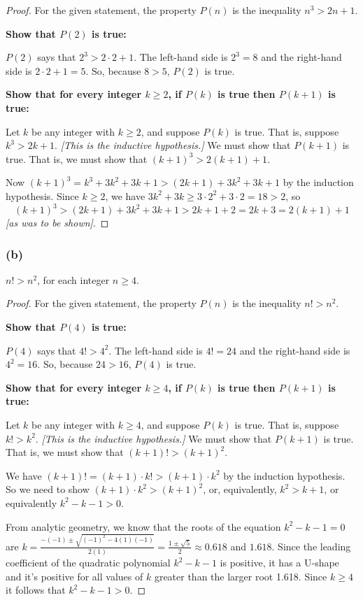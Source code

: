 \documentclass[14pt]{extarticle}
\newcommand{\dps}{\displaystyle}
\begin{document}
\begin{proof}
For the given statement, the property $P(n)$ is the inequality $n^3 > 2n + 1$. 

{\bf Show that $P(2)$ is true:} 

$P(2)$ says that $2^3 > 2\cdot2 + 1$. The left-hand side is $2^3 = 8$ and the right-hand side is $2 \cdot 2 + 1 = 5$. So, because $8 > 5$, $P(2)$ is true. 

{\bf Show that for every integer $k \geq 2$, if $P(k)$ is true then $P(k + 1)$ is true:} 

Let $k$ be any integer with $k \geq 2$, and suppose $P(k)$ is true. That is, suppose $k^3 > 2k + 1$. {\it [This is the inductive hypothesis.]} We must show that $P(k + 1)$ is true. That is, we must show that $(k + 1)^3 > 2(k + 1) + 1$. 

Now $(k + 1)^3 = k^3 + 3k^2 + 3k + 1 > (2k + 1) + 3k^2 + 3k + 1$ by the induction hypothesis. Since $k \geq 2$, we have $3k^2 + 3k \geq 3 \cdot 2^2 + 3 \cdot 2 = 18 > 2$, so
\[
(k + 1)^3 > (2k + 1) + 3k^2 + 3k + 1 > 2k + 1 + 2 = 2k + 3 = 2(k + 1) + 1
\]
{\it [as was to be shown]}.
\end{proof}

\subsubsection{(b)}
$n! > n^2$, for each integer $n \geq 4$.

\begin{proof}
For the given statement, the property $P(n)$ is the inequality $n! > n^2$. 

{\bf Show that $P(4)$ is true:} 

$P(4)$ says that $4! > 4^2$. The left-hand side is $4! = 24$ and the right-hand side is $4^2 = 16$. So, because $24 > 16$, $P(4)$ is true. 

{\bf Show that for every integer $k \geq 4$, if $P(k)$ is true then $P(k + 1)$ is true:} 

Let $k$ be any integer with $k \geq 4$, and suppose $P(k)$ is true. That is, suppose $k! > k^2$. {\it [This is the inductive hypothesis.]} We must show that $P(k + 1)$ is true. That is, we must show that $(k + 1)! > (k + 1)^2$. 

We have $(k + 1)! = (k + 1) \cdot k! > (k + 1) \cdot k^2$ by the induction hypothesis. So we need to show $(k + 1) \cdot k^2 > (k + 1)^2$, or, equivalently, $k^2 > k+1$, or equivalently $k^2 - k - 1 > 0$.

From analytic geometry, we know that the roots of the equation $k^2 - k - 1 = 0$ are $k = \dps \frac{-(-1) \pm \sqrt{(-1)^2 - 4(1)(-1)}}{2(1)} = \frac{1 \pm \sqrt{5}}{2} \approx 0.618$ and $1.618$. Since the leading coefficient of the quadratic polynomial $k^2 - k - 1$ is positive, it has a U-shape and it's positive for all values of $k$ greater than the larger root 1.618. Since $k \geq 4$ it follows that $k^2 - k - 1 > 0$.
\end{proof}
\end{document}
